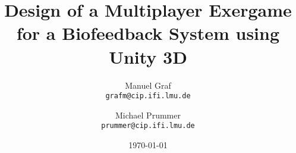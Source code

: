 


\author{ 
Manuel Graf\\
  \texttt{grafm@cip.ifi.lmu.de}
  \and
  Michael Prummer\\
  \texttt{prummer@cip.ifi.lmu.de}
}
\title{Design of a Multiplayer Exergame for a Biofeedback System using Unity 3D
}
\date{\today}





\maketitle

\textbf{}

